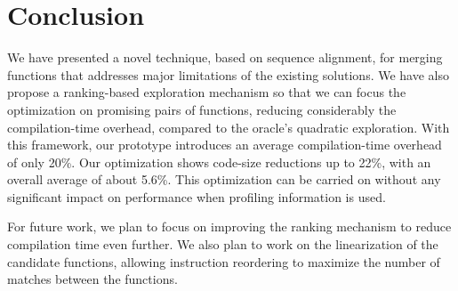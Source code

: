 \vspace{-1ex}
\section{Conclusion}

We have presented a novel technique, based on sequence alignment, for merging
functions that addresses major limitations of the existing solutions.
We have also propose a ranking-based exploration mechanism so that we can focus
the optimization on promising pairs of functions, reducing considerably the
compilation-time overhead, compared to the oracle's quadratic exploration.
With this framework, our prototype introduces an average
compilation-time overhead of only 20\%.
Our optimization shows code-size reductions up to 22\%, with an overall average
of about 5.6\%.
This optimization can be carried on without any significant impact on
performance when profiling information is used.


For future work, we plan to focus on improving the ranking mechanism to reduce
compilation time even further.
We also plan to work on the linearization of the candidate functions, allowing
instruction reordering to maximize the number of matches between the functions.

